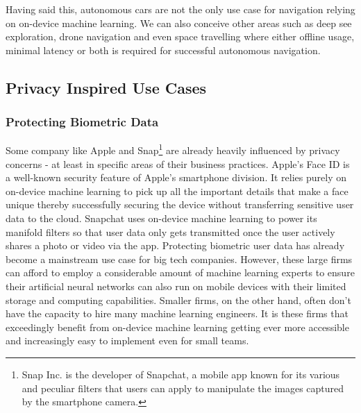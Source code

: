 \documentclass[
			   fontsize=11pt,
               paper=a4,
               bibliography=totoc,
               idxtotoc,
               headsepline,
               footsepline,
               footinclude=false,
               BCOR=12mm,
               DIV=13,
               openany,   %
               ]
               {scrbook}
\begin{document}
Having said this, autonomous cars are not the only use case for navigation relying on on-device machine learning. We can also conceive other areas such as deep see exploration, drone navigation and even space travelling where either offline usage, minimal latency or both is required for successful autonomous navigation.

\subsection{Privacy Inspired Use Cases}

\subsubsection{Protecting Biometric Data}
Some company like Apple and Snap\footnote{Snap Inc. is the developer of Snapchat, a mobile app known for its various and peculiar filters that users can apply to manipulate the images captured by the smartphone camera.} are already heavily influenced by privacy concerns - at least in specific areas of their business practices. Apple's Face ID is a well-known security feature of Apple's smartphone division. It relies purely on on-device machine learning to pick up all the important details that make a face unique thereby successfully securing the device without transferring sensitive user data to the cloud. Snapchat uses on-device machine learning to power its manifold filters so that user data only gets transmitted once the user actively shares a photo or video via the app. Protecting biometric user data has already become a mainstream use case for big tech companies. However, these large firms can afford to employ a considerable amount of machine learning experts to ensure their artificial neural networks can also run on mobile devices with their limited storage and computing capabilities. Smaller firms, on the other hand, often don't have the capacity to hire many machine learning engineers. It is these firms that exceedingly benefit from on-device machine learning getting ever more accessible and increasingly easy to implement even for small teams.
\end{document}
